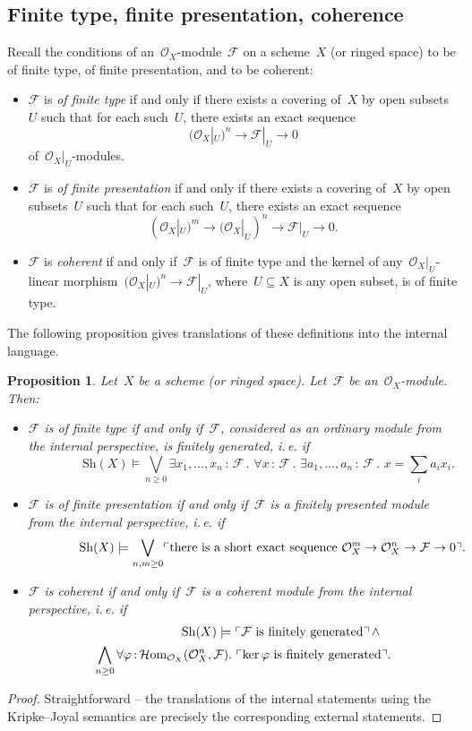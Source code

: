 \documentclass[10pt]{amsart}
\makeatletter
\theoremstyle{definition}
\theoremstyle{plain}
\newtheorem{prop}[defn]{Proposition}
\theoremstyle{remark}
\newcommand{\F}{\mathcal{F}}
\renewcommand{\O}{\mathcal{O}}
\newcommand{\HOM}{\mathcal{H}\mathrm{om}}
\newcommand{\Sh}{\mathrm{Sh}}
\DeclareMathOperator{\Kernel}{ker}
\newcommand{\?}{\,{:}\,}
\renewcommand{\_}{\mathpunct{.}\,}
\newcommand{\speak}[1]{\ulcorner\text{\textnormal{#1}}\urcorner}
\newcommand{\ie}{i.\,e.\@\xspace}
\makeatother
\begin{document}
\subsection{Finite type, finite presentation, coherence}
Recall the conditions of an~$\O_X$-module~$\F$ on a scheme~$X$ (or ringed
space) to be of finite type, of finite presentation, and to be coherent:
\begin{itemize}
\item $\F$ is \emph{of finite type} if and only if there exists a covering of~$X$ by
open subsets~$U$ such that for each such~$U$, there exists an exact sequence
\[ (\O_X|_U)^n \longrightarrow \F|_U \longrightarrow 0 \]
of~$\O_X|_U$-modules.
\item $\F$ is \emph{of finite presentation} if and only if there exists a covering of~$X$ by
open subsets~$U$ such that for each such~$U$, there exists an exact sequence
\[ (\O_X|_U)^m \longrightarrow (\O_X|_U)^n \longrightarrow \F|_U \longrightarrow 0. \]
\item $\F$ is \emph{coherent} if and only if~$\F$ is of finite type and the
kernel of any~$\O_X|_U$-linear morphism~$(\O_X|_U)^n \to \F|_U$, where~$U \subseteq
X$ is any open subset, is of finite type.
\end{itemize}

The following proposition gives translations of these definitions into the
internal language.
\begin{prop}\label{prop:finite-type-and-co}
Let~$X$ be a scheme (or ringed space). Let~$\F$ be
an~$\O_X$-module. Then:
\begin{itemize}
\item $\F$ is of finite type if and only if~$\F$, considered as an ordinary
module from the internal perspective, is finitely generated, \ie if
\[ {\qquad\qquad} \Sh(X) \models
  \bigvee_{n \geq 0}
  \exists x_1,\ldots,x_n\?\F\_
  \forall x\?\F\_
  \exists a_1,\ldots,a_n\?\F\_
  x = \textstyle\sum\limits_i a_i x_i. \]
\item $\F$ is of finite presentation if and only if~$\F$ is a finitely
presented module from the internal perspective, \ie if
\[ {\qquad\qquad} \Sh(X) \models \bigvee_{n,m \geq 0}
  \speak{there is a short exact sequence $\O_X^m \to \O_X^n \to \F \to 0$}.
  \]
\item $\F$ is coherent if and only if~$\F$ is a coherent module from the
internal perspective, \ie if
\begin{multline*}
{\qquad\qquad\qquad}
  \Sh(X) \models \speak{$\F$ is finitely generated} \mathop{\wedge} \\
  \bigwedge_{n \geq 0} \forall \varphi \? \HOM_{\O_X}(\O_X^n,\F)\_
  \speak{$\Kernel \varphi$ is finitely generated}.
\end{multline*}
\end{itemize}
\end{prop}
\begin{proof}Straightforward -- the translations of the internal statements using
the Kripke--Joyal semantics are precisely the corresponding external
statements.
\end{proof}
\end{document}
